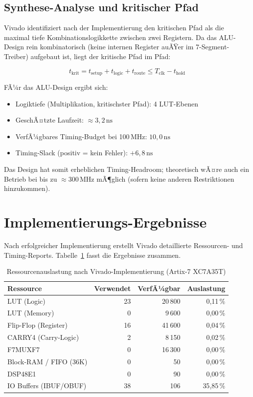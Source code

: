 ﻿\documentclass[12pt,a4paper]{report}
\begin{document}
\subsection{Synthese-Analyse und kritischer Pfad}
\label{subsec:synthese_analyse}

Vivado identifiziert nach der Implementierung den kritischen Pfad als die maximal tiefe Kombinationslogikkette zwischen zwei Registern. Da das ALU-Design rein kombinatorisch (keine internen Register auÃŸer im 7-Segment-Treiber) aufgebaut ist, liegt der kritische Pfad im Pfad:

\[
  t_{\text{krit}} = t_{\text{setup}} + t_{\text{logic}} + t_{\text{route}} \leq T_{\text{clk}} - t_{\text{hold}}
\]

FÃ¼r das ALU-Design ergibt sich:
\begin{itemize}
  \item Logiktiefe (Multiplikation, kritischster Pfad): 4 LUT-Ebenen
  \item GeschÃ¤tzte Laufzeit: $\approx 3{,}2\,\text{ns}$
  \item VerfÃ¼gbares Timing-Budget bei 100\,MHz: $10{,}0\,\text{ns}$
  \item Timing-Slack (positiv = kein Fehler): $+6{,}8\,\text{ns}$
\end{itemize}

Das Design hat somit erheblichen Timing-Headroom; theoretisch wÃ¤re auch ein Betrieb bei bis zu $\approx 300\,\text{MHz}$ mÃ¶glich (sofern keine anderen Restriktionen hinzukommen).

\section{Implementierungs-Ergebnisse}
\label{sec:impl_ergebnisse}

Nach erfolgreicher Implementierung erstellt Vivado detaillierte Ressourcen- und Timing-Reports. Tabelle~\ref{tab:ressourcen} fasst die Ergebnisse zusammen.

\begin{table}[H]
\centering
\begin{tabular}{|l|r|r|r|}
\hline
\textbf{Ressource} & \textbf{Verwendet} & \textbf{VerfÃ¼gbar} & \textbf{Auslastung} \\
\hline
LUT (Logic)               & 23  & 20\,800 & 0{,}11\,\% \\
LUT (Memory)              & 0   & 9\,600  & 0{,}00\,\% \\
Flip-Flop (Register)      & 16  & 41\,600 & 0{,}04\,\% \\
CARRY4 (Carry-Logic)      & 2   & 8\,150  & 0{,}02\,\% \\
F7MUXF7                   & 0   & 16\,300 & 0{,}00\,\% \\
Block-RAM / FIFO (36K)    & 0   & 50      & 0{,}00\,\% \\
DSP48E1                   & 0   & 90      & 0{,}00\,\% \\
IO Buffers (IBUF/OBUF)    & 38  & 106     & 35{,}85\,\% \\
\hline
\end{tabular}
\caption{Ressourcenauslastung nach Vivado-Implementierung (Artix-7 XC7A35T)}
\label{tab:ressourcen}
\end{table}
\end{document}
